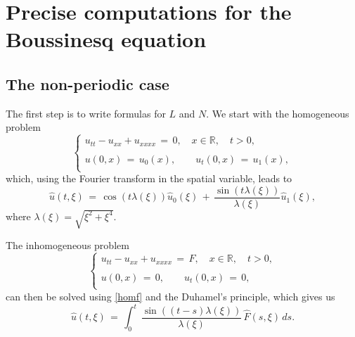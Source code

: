 \documentclass{amsart}
\begin{document}
%
%


\section{Precise computations for the Boussinesq equation}

\subsection{The non-periodic case} The first step is to write formulas for $L$ and $N$. We start with the homogeneous problem
\begin{equation}
\left\{
\begin{array}{l}
u_{tt}-u_{xx}+u_{xxxx}\,=\,0, \quad x\in\mathbb{R}, \quad t>0,\\
\\
u(0,x)\,=\,u_0(x),\qquad u_t(0,x)\,=\,u_1(x),\\
\end{array}\right.
\label{hom}
\end{equation}
which, using the Fourier transform in the spatial variable, leads to
\begin{equation}
\hat{u}(t,\xi)\,=\,\cos(t \lambda(\xi)) \hat{u}_0(\xi)\,+\,\frac{\sin(t \lambda(\xi))}{\lambda(\xi)} \hat{u}_1(\xi),
\label{homf}\end{equation}
where $\lambda(\xi)=\sqrt{\xi^2+\xi^4}$.

The inhomogeneous problem 
\begin{equation}
\left\{
\begin{array}{l}
u_{tt}-u_{xx}+u_{xxxx}\,=\,F, \quad x\in\mathbb{R}, \quad t>0,\\
\\
u(0,x)\,=\,0,\qquad u_t(0,x)\,=\,0,\\
\end{array}\right.
\label{ih}
\end{equation}
can then be solved using \eqref{homf} and the Duhamel's principle, which gives us
\begin{equation}
\hat{u}(t,\xi)\,=\,\int_0^t\,\frac{\sin((t-s) \lambda(\xi))}{\lambda(\xi)} \,\hat{F}(s,\xi)\,ds.
\label{ihf}
\end{equation}
\end{document}
